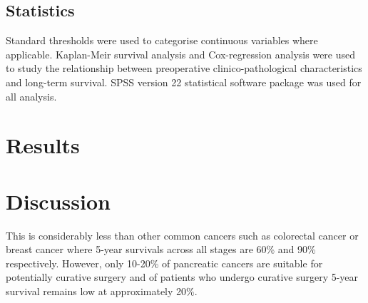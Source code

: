 \subsection{Statistics}
Standard thresholds were used to categorise continuous variables where applicable. Kaplan-Meir survival analysis and Cox-regression analysis were used to study the relationship between preoperative clinico-pathological characteristics and long-term survival. SPSS version 22 statistical software package was used for all analysis.



\section{Results}


\section{Discussion}

 This is considerably less than other common cancers such as colorectal cancer or breast cancer where 5-year survivals across all stages are 60\% and 90\% respectively. However, only 10-20\% of pancreatic cancers are suitable for potentially curative surgery and of patients who undergo curative surgery 5-year survival remains low at approximately 20\%.\parencite{cancerresearchuk_cancer_2014}